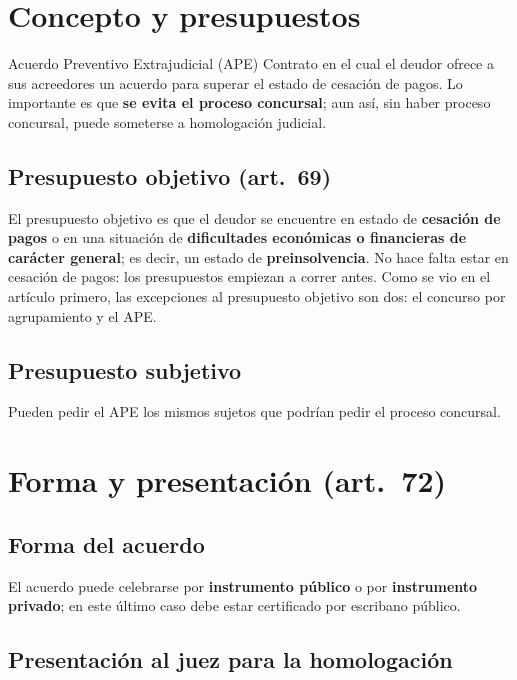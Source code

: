 \documentclass[12pt,oneside]{book}
\begin{document}
\section{Concepto y presupuestos}

\begin{definition}{Acuerdo Preventivo Extrajudicial (APE)}
Contrato en el cual el deudor ofrece a sus acreedores un acuerdo para superar el estado de cesación de pagos. Lo importante es que \textbf{se evita el proceso concursal}; aun así, sin haber proceso concursal, puede someterse a homologación judicial.
\end{definition}

\subsection{Presupuesto objetivo (art.~69)}

El presupuesto objetivo es que el deudor se encuentre en estado de \textbf{cesación de pagos} o en una situación de \textbf{dificultades económicas o financieras de carácter general}; es decir, un estado de \textbf{preinsolvencia}. No hace falta estar en cesación de pagos: los presupuestos empiezan a correr antes. Como se vio en el artículo primero, las excepciones al presupuesto objetivo son dos: el concurso por agrupamiento y el APE.

\subsection{Presupuesto subjetivo}

Pueden pedir el APE los mismos sujetos que podrían pedir el proceso concursal.

\section{Forma y presentación (art.~72)}

\subsection{Forma del acuerdo}

El acuerdo puede celebrarse por \textbf{instrumento público} o por \textbf{instrumento privado}; en este último caso debe estar certificado por escribano público.

\subsection{Presentación al juez para la homologación}
\end{document}
